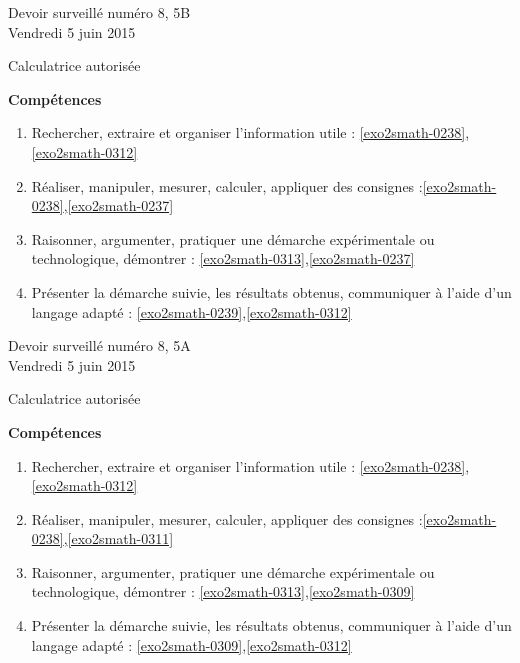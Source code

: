 \documentclass[a4paper,10pt]{article}
\begin{document}
\begin{feuilleDS}{Devoir surveillé numéro 8, 5B\\ \small Vendredi  5 juin 2015}
    \begin{center}
        Calculatrice autorisée
    \end{center}
\vspace{1cm}


{\bf Compétences}
\small
\begin{enumerate}
    \item
        Rechercher, extraire et organiser l'information utile : \ref{exo2smath-0238},\ref{exo2smath-0312}
    \item
        Réaliser, manipuler, mesurer, calculer, appliquer des consignes :\ref{exo2smath-0238},\ref{exo2smath-0237}
    \item
        Raisonner, argumenter, pratiquer une démarche expérimentale ou technologique, démontrer : \ref{exo2smath-0313},\ref{exo2smath-0237}
    \item 
        Présenter la démarche suivie, les résultats obtenus, communiquer à l'aide d’un langage adapté : \ref{exo2smath-0239},\ref{exo2smath-0312}
\end{enumerate}
\end{feuilleDS}


\begin{feuilleDS}{Devoir surveillé numéro 8, 5A\\ \small Vendredi  5 juin 2015}
    \begin{center}
        Calculatrice autorisée
    \end{center}
\vspace{1cm}


{\bf Compétences}
\small
\begin{enumerate}
    \item
        Rechercher, extraire et organiser l'information utile : \ref{exo2smath-0238},\ref{exo2smath-0312}
    \item
        Réaliser, manipuler, mesurer, calculer, appliquer des consignes :\ref{exo2smath-0238},\ref{exo2smath-0311}
    \item
        Raisonner, argumenter, pratiquer une démarche expérimentale ou technologique, démontrer : \ref{exo2smath-0313},\ref{exo2smath-0309}
    \item 
        Présenter la démarche suivie, les résultats obtenus, communiquer à l'aide d’un langage adapté : \ref{exo2smath-0309},\ref{exo2smath-0312}
\end{enumerate}
\end{feuilleDS}
\end{document}
